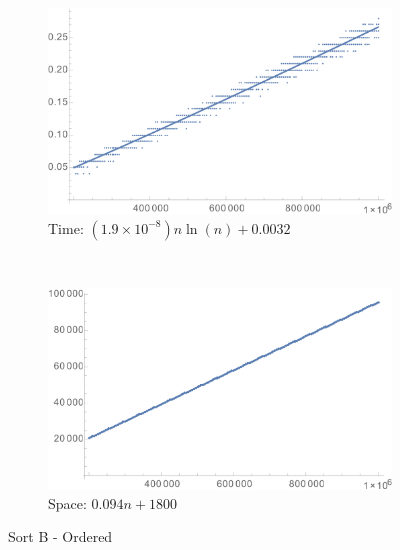 \documentclass[a4paper]{scrartcl}
\begin{document}
\begin{figure}[p]
    \centering
    \begin{subfigure}[b]{0.45\textwidth}
        \includegraphics[width = \textwidth]{sortB_ordered_time.png}
        \caption{Time: \((1.9 \times 10^{-8}) n \ln{(n)} + 0.0032\)}
    \end{subfigure}
    ~
    \begin{subfigure}[b]{0.45\textwidth}
        \includegraphics[width = \textwidth]{sortB_ordered_space.png}
        \caption{Space: \(0.094 n + 1800\)}
    \end{subfigure}
    \caption{Sort B - Ordered}
    \label{fig:sortB_ordered}
\end{figure}
\end{document}
